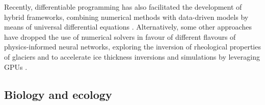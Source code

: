 Recently, differentiable programming has also facilitated the development of hybrid frameworks, combining numerical methods with data-driven models by means of universal differential equations \cite{BolibarSapienza_UDEs}. 
Alternatively, some other approaches have dropped the use of numerical solvers in favour of different flavours of physics-informed neural networks, exploring the inversion of rheological properties of glaciers \cite{wang2022discovering} and to accelerate ice thickness inversions and simulations by leveraging GPUs \cite{Jouvet_Cordonnier_Kim_Lüthi_Vieli_Aschwanden_2021, jouvet2023inversion}. 


\subsection{Biology and ecology}

